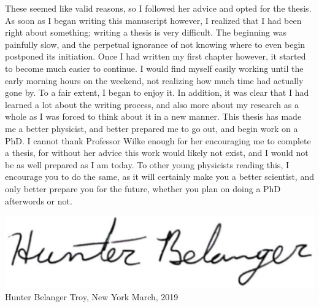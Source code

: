 These seemed like valid reasons, so I followed her advice and opted for the thesis. As soon as I began writing this manuscript however, I realized that I had been right about something; writing a thesis is very difficult. The beginning was painfully slow, and the perpetual ignorance of not knowing where to even begin postponed its initiation. Once I had written my first chapter however, it started to become much easier to continue. I would find myself easily working until the early morning hours on the weekend, not realizing how much time had actually gone by. To a fair extent, I began to enjoy it. In addition, it was clear that I had learned a lot about the writing process, and also more about my research as a whole as I was forced to think about it in a new manner. This thesis has made me a better physicist, and better prepared me to go out, and begin work on a PhD. I cannot thank Professor Wilke enough for her encouraging me to complete a thesis, for without her advice this work would likely not exist, and I would not be as well prepared as I am today. To other young physicists reading this, I encourage you to do the same, as it will certainly make you a better scientist, and only better prepare you for the future, whether you plan on doing a PhD afterwords or not.
\newline
\begin{flushleft}
\includegraphics[scale=0.2]{images/signature.png}\newline
Hunter Belanger
\newline\newline
Troy, New York\newline
March, 2019
\end{flushleft}
